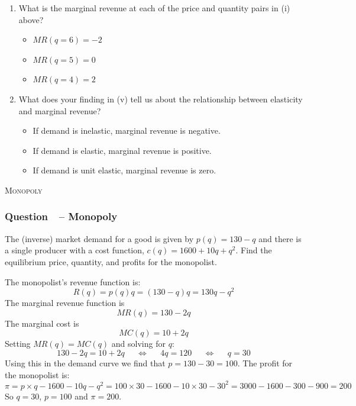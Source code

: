 \documentclass[12pt]{article}
\newcommand{\topic}[1]{\medskip\begin{center}\large\textsc{#1}\normalsize
  \end{center}}
\newcounter{question}[section]
\newcommand{\question}[1]{\refstepcounter{question}
  \subsubsection*{Question~\thequestion~-- #1}}
\newenvironment{subquestions}{
  \begin{enumerate}[label=(\roman*)]}{\end{enumerate}}
\begin{document}
\begin{subquestions}
  \textcolor{solution-color}{
    The marginal revenue function is:
    \[
      MR\left( q \right)=\frac{dR\left( q \right)}{dq}=10-2q
    \]
    }
  \item What is the marginal revenue at each of the price and quantity pairs in
    (i) above?
    \textcolor{solution-color}{
      \begin{itemize}
        \item $MR\left( q=6 \right)=-2$
        \item $MR\left( q=5 \right)=0$
        \item $MR\left( q=4 \right)=2$
      \end{itemize}
    }
  \item What does your finding in (v) tell us about the relationship between
    elasticity and marginal revenue?
    \textcolor{solution-color}{
      \begin{itemize}
        \item If demand is inelastic, marginal revenue is negative.
        \item If demand is elastic, marginal revenue is positive.
        \item If demand is unit elastic, marginal revenue is zero.
      \end{itemize}
    }
\end{subquestions}

\topic{Monopoly}
\question{Monopoly}
The (inverse) market demand for a good is given by $p\left( q \right)=130-q$
and there is a single producer with a cost function, $c(q) = 1600+10q+q^2$.
Find the equilibrium price, quantity, and profits for the monopolist.

    \textcolor{solution-color}{
      The monopolist's revenue function is:
      \[R\left( q \right)=p\left( q
      \right)q=\left( 130-q
    \right)q=130q-q^2\]
    The marginal revenue function is \[MR\left( q
    \right)=130-2q\]
    The marginal cost is \[MC\left( q \right)=10+2q\]
      Setting $MR\left( q \right)=MC\left( q \right)$ and solving for $q$:
      \[
        130-2q=10+2q \;\;\;\;\;\Longleftrightarrow\;\;\;\;\;
        4q=120\;\;\;\;\;\Longleftrightarrow\;\;\;\;\;
        q=30
      \]
      Using this in the demand curve we find that $p=130-30=100$.
      The profit for the monopolist is:
      \[
        \pi = p\times q - 1600 - 10q - q^2 = 100\times 30 - 1600 - 10\times 30
        - 30^2 = 3000 - 1600 - 300 - 900 =200
      \]
      So $q=30$, $p=100$ and $\pi=200$.
}
\end{document}

